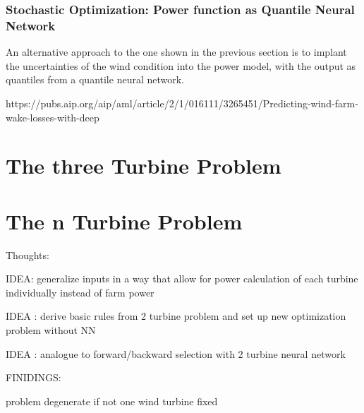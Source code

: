 	
\subsubsection{Stochastic Optimization:  Power function as Quantile Neural Network}

An alternative approach to the one shown in the previous section is to implant the uncertainties of the wind condition into the power model, with the output as quantiles from a quantile neural network. 


https://pubs.aip.org/aip/aml/article/2/1/016111/3265451/Predicting-wind-farm-wake-losses-with-deep

	

\section{The three Turbine Problem}

\section{The n Turbine Problem}

Thoughts: 

IDEA: generalize inputs in a way that allow for power calculation of each turbine individually instead of farm power

IDEA : derive basic rules from 2 turbine problem and set up new optimization problem without NN 

IDEA : analogue to forward/backward selection with 2 turbine neural network


FINIDINGS: 

problem degenerate if not one wind turbine fixed
